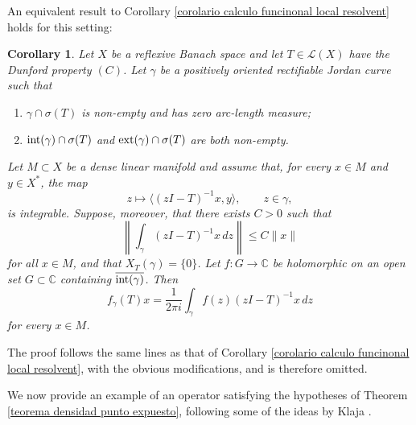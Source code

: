 \documentclass[11pt]{amsart}
\newtheorem{corollary}[theorem]{Corollary}
\theoremstyle{definition}
\theoremstyle{remark}
\numberwithin{equation}{section}
\newcommand{\C}{\mathbb{C}}
\newcommand{\inte}{\textnormal{int}}
\newcommand{\exte}{\textnormal{ext}}
\begin{document}
An equivalent result to Corollary \ref{corolario calculo funcinonal local resolvent} holds for this setting:

\begin{corollary}
Let $X$ be a reflexive Banach space and let $T\in\mathcal{L}(X)$ have the Dunford property $(C)$. Let $\gamma$ be a positively oriented rectifiable Jordan curve such that
\begin{enumerate}
\item[(i)] $\gamma\cap\sigma(T)$ is non-empty and has zero arc-length measure;
\item[(ii)] $\inte(\gamma)\cap\sigma(T)$ and $\exte(\gamma)\cap\sigma(T)$ are both non-empty.
\end{enumerate}
Let $M\subset X$ be a dense linear manifold and assume that, for every $x\in M$ and $y\in X^*$, the map
$$
z\mapsto \langle (zI-T)^{-1}x,y\rangle ,\qquad z\in\gamma,
$$
is integrable. Suppose, moreover, that there exists $C>0$ such that
\begin{equation}\label{acotacion norma integral-}
\left\|\int_\gamma (zI-T)^{-1}x\,dz\right\|\le C\|x\|
\end{equation}
for all $x\in M$, and that $X_T(\gamma)=\{0\}$.  Let $f:G\to\C$ be holomorphic on an open set $G\subset\C$ containing $\overline{\inte(\gamma)}$. Then
$$
f_\gamma(T)x=\frac{1}{2\pi i}\int_\gamma f(z)(zI-T)^{-1}x\,dz
$$
for every $x\in M$.
\end{corollary}

The proof follows the same lines as that of Corollary \ref{corolario calculo funcinonal local resolvent}, with the obvious modifications, and is therefore omitted.

\medskip

We now provide an example of an operator satisfying the hypotheses of Theorem \ref{teorema densidad punto expuesto}, following some of the ideas by Klaja  \cite{Klaja}.
\end{document}

